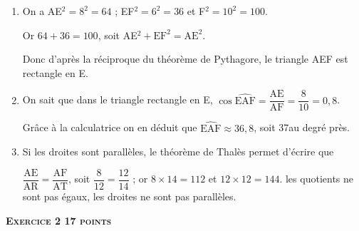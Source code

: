 \documentclass[10pt]{article}
\begin{document}
\begin{enumerate}
	\item %
On a AE$^2 = 8^2 = 64$ ; EF$^2 = 6^2 = 36$ et F$^2 = 10^2 = 100$.

Or $64 + 36 = 100$, soit AE$^2 + \text{EF}^2 = \text{AE}^2$.

Donc d'après la réciproque du théorème de Pythagore, le triangle AEF est rectangle en E.	
	\item %
	On sait que dans le triangle rectangle en E, $\cos \widehat{\text{EAF}} = \dfrac{\text{AE}}{\text{AF}} = \dfrac{8}{10} = 0,8$.
	
	Grâce à la calculatrice on en déduit que $\widehat{\text{EAF}} \approx 36,8$, soit 37\degres au degré près.
	\item %
Si les droites sont parallèles, le théorème de Thalès permet d'écrire que 

$\dfrac{\text{AE}}{\text{AR}} = \dfrac{\text{AF}}{\text{AT}}$, soit $\dfrac{8}{12} = \dfrac{12}{14}$ ; or $8 \times 14 = 112$ et $12 \times 12 = 144$. les quotients ne sont pas égaux, les droites ne sont pas parallèles.
\end{enumerate}

\vspace{0,5cm}

\textbf{\textsc{Exercice 2 \hfill 17 points}}

\medskip


%
\end{document}
